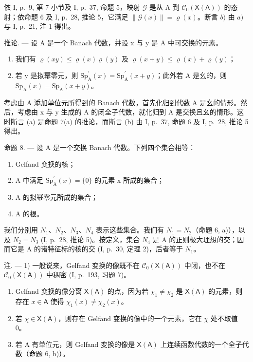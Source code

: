 依 I, p.~9, 第 7 小节及 I, p.~37, 命题 5，映射 \(\mathcal{G}\) 是从 A 到 \(\mathcal{C}_0(\mathsf{X}(\mathsf{A}))\) 的态射；依命题 6 及 I, p.~28, 推论 5，它满足 \(\| \mathcal{G}(x)\| = \varrho (x)\)。断言 \(b)\) 由 \(a)\) 与 I, p.~21, 注 1 得出。

推论. --- 设 A 是一个 Banach 代数，并设 x 与 y 是 A 中可交换的元素。

\begin{enumerate}
\def\labelenumi{\alph{enumi})}
\item
  我们有 \(\varrho(xy) \leqslant \varrho(x)\varrho(y)\) 及 \(\varrho(x + y) \leqslant \varrho(x) + \varrho(y)\)；
\item
  若 y 是拟幂零元，则 \(\mathrm{Sp}_{\mathrm{A}}^{\prime}(x)=\mathrm{Sp}_{\mathrm{A}}^{\prime}(x+y)\)；此外若 A 是幺的，则 \(\mathrm{Sp}_{\mathrm{A}}(x)=\mathrm{Sp}_{\mathrm{A}}(x+y)\)。
\end{enumerate}

考虑由 A 添加单位元所得到的 Banach 代数，首先化归到代数 A 是幺的情形。然后，考虑由 x 与 y 生成的 A 的闭全子代数，就化归到 A 是交换且幺的情形。这时断言 (a) 是命题 7(a) 的推论，而断言 (b) 由 I, p.~37, 命题 6 及 I, p.~28, 推论 5 得出。

命题 8. --- 设 A 是一个交换 Banach 代数。下列四个集合相等：

\begin{enumerate}
\def\labelenumi{(\roman{enumi})}
\item
  Gelfand 变换的核；
\item
  A 中满足 \(\mathrm{Sp}_{\mathrm{A}}^{\prime}(x)=\{0\}\) 的元素 x 所成的集合；
\item
  A 的拟幂零元所成的集合；
\item
  A 的根。
\end{enumerate}

我们分别用 \(N_{1}\)、\(N_{2}\)、\(N_{3}\)、\(N_{4}\) 表示这些集合。我们有 \(N_{1} = N_{2}\)（命题 6, a)），以及 \(N_{2} = N_{3}\) (I, p.~28, 推论 5)。按定义，集合 \(N_{4}\) 是 A 的正则极大理想的交；因而它是 A 的诸特征标的核的交 (I, p.~30, 定理 2)，后者等于 \(N_{1}\)。

注. --- 1) 一般说来，Gelfand 变换的像既不在 \(\mathcal{C}_{0}(\mathsf{X}(\mathsf{A}))\) 中闭，也不在 \(\mathcal{C}_{0}(\mathsf{X}(\mathsf{A}))\) 中稠密 (I, p.~193, 习题 7)。

\begin{enumerate}
\def\labelenumi{\arabic{enumi})}
\setcounter{enumi}{1}
\item
  Gelfand 变换的像分离 \(\mathsf{X}(\mathsf{A})\) 的点，因为若 \(\chi_1 \neq \chi_2\) 是 \(\mathsf{X}(\mathsf{A})\) 的元素，则存在 \(x \in \mathsf{A}\) 使得 \(\chi_1(x) \neq \chi_2(x)\)。
\item
  若 \(\chi \in \mathsf{X}(\mathsf{A})\)，则存在 Gelfand 变换的像中的一个元素，它在 \(\chi\) 处不取值 0。
\item
  若 A 有单位元，则 Gelfand 变换的像是 \(\mathsf{X}(\mathsf{A})\) 上连续函数代数的一个全子代数（命题 6, b)）。
\end{enumerate}

